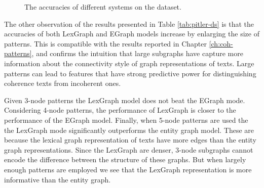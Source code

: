 \begin{figure}[!ht]
  \begin{center}
    \mydata
\end{center}
  \caption{The accuracies of different systems on the \pitlerds dataset.}
  \label{fig:pitler-ds}
\end{figure}



The other observation of the results presented in Table \ref{tab:pitler-ds} is that the accuracies of both \mbox{LexGraph} and EGraph models increase by enlarging the size of patterns.  
This is compatible with the results reported in Chapter \ref{ch:coh-patterns}, and confirms the intuition that large subgraphs have capture more information about the connectivity style of graph representations of texts.
Large patterns can lead to features that have strong predictive power for distinguishing coherence texts from incoherent ones. 

Given 3-node patterns the LexGraph model does not beat the EGraph mode. 
Considering 4-node patterns, the performance of LexGraph is closer to the performance of the EGraph model. 
Finally, when 5-node patterns are used the the LexGraph mode significantly outperforms the entity graph model. 
These are because the lexical graph representation of texts have more edges than the entity graph representations. 
Since the LexGraph are denser, 3-node subgraphs cannot encode the difference between the structure of these graphs. 
But when largely enough patterns are employed we see that the LexGraph representation is more informative than the entity graph.   

